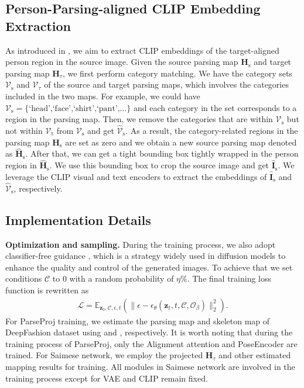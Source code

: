 \subsection{Person-Parsing-aligned CLIP Embedding Extraction}
\label{subsec: parseclip}

As introduced in , we aim to extract CLIP embeddings of the target-aligned person region in the source image.
%
Given the source parsing map $\mathbf{H}_\text{s}$ and target parsing map $\mathbf{H}_\tau$, we first perform category matching. 
%
We have the category sets $\mathcal{V}_\text{s}$ and $\mathcal{V}_\tau$ of the source and target parsing maps, which involves the categories included in the two maps.
%
For example, we could have $\mathcal{V}_\text{s}=\{\text{`head',`face',`shirt',`pant',\ldots}\}$ and
%
each category in the set corresponds to a region in the parsing map.
%
Then, we remove the categories that are within $\mathcal{V}_\text{s}$ but not within $\mathcal{V}_\text{t}$ from $\mathcal{V}_\text{s}$ and get $\hat{\mathcal{V}}_\text{s}$.
%
As a result, the category-related regions in the parsing map $\mathbf{H}_\text{s}$ are set as zero and we obtain a new source parsing map denoted as $\hat{\mathbf{H}}_\text{s}$.
%
After that, we can get a tight bounding box tightly wrapped in the person region in $\hat{\mathbf{H}}_\text{s}$.
%
We use this bounding box to crop the source image and get $\hat{\mathbf{I}}_\text{s}$. 
%
We leverage the CLIP visual and text encoders to extract the embeddings of $\hat{\mathbf{I}}_\text{s}$ and $\hat{\mathcal{V}}_\text{s}$, respectively.

\subsection{Implementation Details}
\label{subsec:implementation}

\textbf{Optimization and sampling.}
%
During the training process, we also adopt classifier-free guidance \cite{ho2022classifier}, which is a strategy widely used in diffusion models to enhance the quality and control of the generated images. To achieve that we set conditions $\mathcal{C}$ to 0 with a random probability of $\eta$\%.
The final training loss function is rewritten as
%
\begin{align} 
    \label{eq:saimese_loss}
      \mathcal{L} = \mathds{E}_{\mathbf{z}_0, \mathcal{C}, \epsilon, t}(\|\epsilon-\epsilon_\theta(\mathbf{z}_t, t, \mathcal{C},\mathcal{O}_\beta)\|^2_2).
\end{align}
%
For ParseProj training, we estimate the parsing map and skeleton map of DeepFashion dataset using \cite{li2020self} and \cite{yang2023effective}, respectively. It is worth noting that during the training process of ParseProj, only the Alignment attention and PoseEncoder are trained.
For Saimese network, we employ the projected $\mathbf{H}_\tau$ and other estimated mapping results for training. All modules in Saimese network are involved in the training process except for VAE and CLIP remain fixed. 
%

